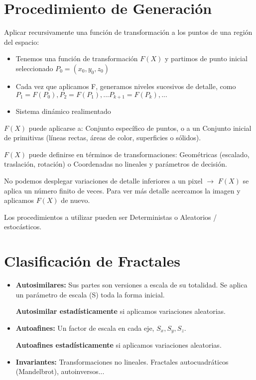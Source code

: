 \section{Procedimiento de Generación}
Aplicar recursivamente una función de transformación a los puntos de una región del espacio:
\begin{itemize}
	\item Tenemos una función de transformación $F(X)$ y partimos de punto inicial seleccionado $P_0 =(x_0 , y_0 , z_0 )$
	\item Cada vez que aplicamos F, generamos niveles sucesivos de detalle, como $P_1 =F(P_0 ), P_2 =F(P_1 ), ... P_{k+1} =F(P_k ), ...$
	\item Sistema dinámico realimentado
\end{itemize}

$F(X)$ puede aplicarse a: Conjunto específico de puntos, o a un Conjunto inicial de primitivas (líneas rectas, áreas de color, superficies o sólidos).

$F(X)$ puede definirse en términos de transformaciones: Geométricas (escalado, traslación, rotación) o Coordenadas no lineales y parámetros de decisión.

No podemos desplegar variaciones de detalle inferiores a un pixel $\rightarrow$ $F(X)$ se aplica un número finito de veces. Para ver más detalle acercamos la imagen y aplicamos $F(X)$ de nuevo.

Los procedimientos a utilizar pueden ser Deterministas o Aleatorios / estocásticos.

\section{Clasificación de Fractales}
\begin{itemize}
	\item \textbf{Autosimilares:} Sus partes son versiones a escala de su totalidad. Se aplica un parámetro de escala (S) toda la forma inicial.

	      \textbf{Autosimilar estadísticamente} si aplicamos variaciones aleatorias.
	\item \textbf{Autoafines:} Un factor de escala en cada eje, $S_x, S_y, S_z$.

	      \textbf{Autoafines estadísticamente} si aplicamos variaciones aleatorias.
	\item \textbf{Invariantes:} Transformaciones no lineales. Fractales autocuadráticos (Mandelbrot), autoinversos...
\end{itemize}

